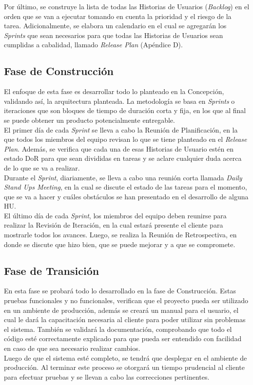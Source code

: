 Por último, se construye la lista de todas las Historias de Usuarios (\textit{Backlog}) en el orden que se van a ejecutar tomando en cuenta la prioridad y el riesgo de la tarea. Adicionalmente, se elabora un calendario en el cual se agregarán los \textit{Sprints} que sean necesarios para que todas las Historias de Usuarios sean cumplidas a cabalidad, llamado \textit{Release Plan} (Apéndice D).

\subsection{Fase de Construcción}

El enfoque de esta fase es desarrollar todo lo planteado en la Concepción, validando así, la arquitectura planteada. La metodología se basa en \textit{Sprints} o iteraciones que son bloques de tiempo de duración corta y fija, en los que al final se puede obtener un producto potencialmente entregable. \\

El primer día de cada \textit{Sprint} se lleva a cabo la Reunión de Planificación, en la que todos los miembros del equipo revisan lo que se tiene planteado en el \textit{Release Plan}. Además, se verifica que cada una de esas Historias de Usuario estén en estado DoR para que sean divididas en tareas y se aclare cualquier duda acerca de lo que se va a realizar. \\

Durante el \textit{Sprint}, diariamente, se lleva a cabo una reunión corta llamada \textit{Daily Stand Ups Meeting}, en la cual se discute el estado de las tareas para el momento, que se va a hacer y cuáles obstáculos se han presentado en el desarrollo de alguna HU.\\

El último día de cada \textit{Sprint}, los miembros del equipo deben reunirse para realizar la Revisión de Iteración, en la cual estará presente el cliente para mostrarle todos los avances. Luego, se realiza la Reunión de Retrospectiva, en donde se discute que hizo bien, que se puede mejorar y a que se compromete.

\subsection{Fase de Transición}

En esta fase se probará todo lo desarrollado en la fase de Construcción. Estas pruebas funcionales y no funcionales, verifican que el proyecto pueda ser utilizado en un ambiente de producción, además se creará un manual para el usuario, el cual le dará la capacitación necesaria al cliente para poder utilizar sin problemas el sistema. También se validará la documentación, comprobando que todo el código esté correctamente explicado para que pueda ser entendido con facilidad en caso de que sea necesario realizar cambios.\\

Luego de que el sistema esté completo, se tendrá que desplegar en el ambiente de producción. Al terminar este proceso se otorgará un tiempo prudencial al cliente para efectuar pruebas y se llevan a cabo las correcciones pertinentes.
